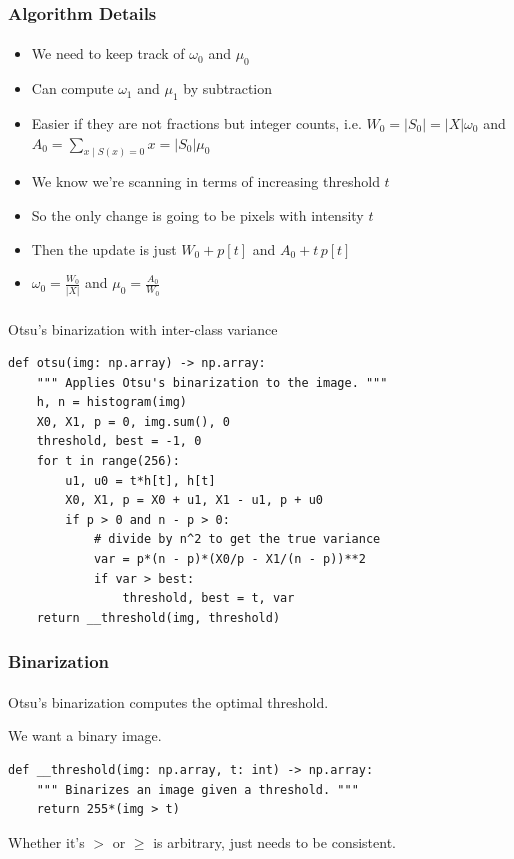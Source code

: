 \documentclass{beamer}                             %
\begin{document}
\begin{frame}
\frametitle{Algorithm Details}
\framesubtitle{}
\begin{itemize}
  \item We need to keep track of \( \omega_0 \) and \( \mu_0 \)
  \item Can compute \( \omega_1 \) and \( \mu_1 \) by subtraction 
  \item Easier if they are not fractions but integer counts, i.e.
    \( W_0 = |S_0| = |X| \omega_0 \) and \\
    \( A_0 = \sum_{x \mid S(x) = 0} x = |S_0| \mu_0 \) 
  \item We know we're scanning in terms of increasing threshold \( t \)
  \item So the only change is going to be pixels with intensity \( t \)
  \item Then the update is just \( W_0 + p[t] \) and \( A_0 + t \, p[t] \)
  \item \( \omega_0 = \frac{W_0}{|X|} \) and \( \mu_0 = \frac{A_0}{W_0} \)
\end{itemize}
\end{frame}

\begin{frame}[fragile]
\frametitle{}
\framesubtitle{}
\begin{algorithm}[H]
  \caption{Otsu's binarization with inter-class variance}
  \begin{verbatim}
def otsu(img: np.array) -> np.array:
    """ Applies Otsu's binarization to the image. """
    h, n = histogram(img)
    X0, X1, p = 0, img.sum(), 0
    threshold, best = -1, 0
    for t in range(256):
        u1, u0 = t*h[t], h[t]
        X0, X1, p = X0 + u1, X1 - u1, p + u0
        if p > 0 and n - p > 0:
            # divide by n^2 to get the true variance
            var = p*(n - p)*(X0/p - X1/(n - p))**2
            if var > best:
                threshold, best = t, var
    return __threshold(img, threshold)
  \end{verbatim}
\end{algorithm}
\end{frame}

\begin{frame}[fragile]
\frametitle{Binarization}
\framesubtitle{}
Otsu's binarization computes the optimal threshold.

We want a binary image.

\begin{verbatim}
def __threshold(img: np.array, t: int) -> np.array:
    """ Binarizes an image given a threshold. """
    return 255*(img > t)
\end{verbatim}

Whether it's \( > \) or \( \geq \) is arbitrary, just needs to be consistent.
\end{frame}
\end{document}
